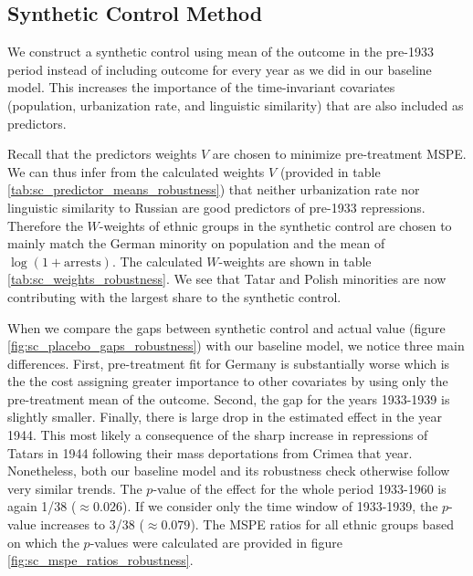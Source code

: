\subsection{Synthetic Control Method}
 We construct a synthetic control  using mean of the outcome in the pre-1933 period instead of including outcome for every year as we did in our baseline model. This increases the importance of the time-invariant covariates (population, urbanization rate, and linguistic similarity) that are also included as predictors.


Recall that the predictors weights $V$ are chosen to minimize pre-treatment MSPE. We can thus infer from the calculated  weights $V$ (provided in table \ref{tab:sc_predictor_means_robustness})  that neither urbanization rate nor linguistic similarity to Russian are good predictors of pre-1933 repressions. 
Therefore the $W$-weights of ethnic groups in the synthetic control are chosen to mainly match the German minority on population and the mean of $\log\left(1 + \text{arrests}\right)$. 
 The calculated $W$-weights  are shown in table \ref{tab:sc_weights_robustness}. We see that Tatar and Polish minorities are now contributing with the largest share to the synthetic control. 



When we compare the gaps between synthetic control and actual value (figure \ref{fig:sc_placebo_gaps_robustness}) with our baseline model, we notice three main differences. First, pre-treatment fit for Germany is substantially worse which is the the cost
assigning greater importance to other covariates by  using only the pre-treatment mean of the outcome. Second, the gap for the years 1933-1939 is slightly smaller. Finally, there is large drop in the estimated effect in the year 1944. This most likely a consequence of the sharp increase in repressions of Tatars in 1944 following their mass deportations from Crimea that year. 
Nonetheless, both our baseline model and its robustness check otherwise follow very similar trends.
The $p$-value of the effect for the whole period 1933-1960  is again 1/38 ($\approx 0.026$). If we consider only the time window of  1933-1939, the 
$p$-value increases to 3/38 ($\approx 0.079$). The MSPE ratios for all ethnic groups based on which the $p$-values were calculated are provided in figure \ref{fig:sc_mspe_ratios_robustness}.

